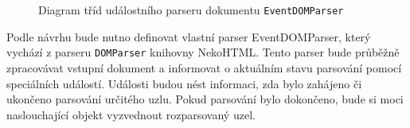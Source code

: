 \begin{figure}[H]
  \begin{center}
    \caption{Diagram tříd událostního parseru dokumentu \texttt{EventDOMParser}}
    \label{Figure.EventDOMParserDesign}
  \end{center}
\end{figure}

Podle návrhu bude nutno definovat vlastní parser EventDOMParser, který vychází z parseru \texttt{DOMParser} knihovny NekoHTML. Tento parser bude průběžně zpracovávat vstupní dokument a informovat o aktuálním stavu parsování pomocí speciálních událostí. Události budou nést informaci, zda bylo zahájeno či ukončeno parsování určitého uzlu. Pokud parsování bylo dokončeno, bude si moci naslouchající objekt vyzvednout rozparsovaný uzel. 

